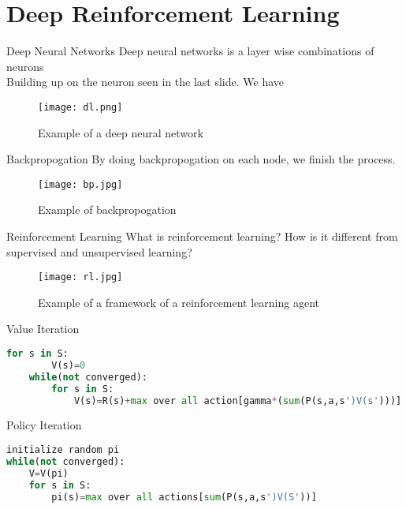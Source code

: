 \section{Deep Reinforcement Learning}
\frame{\sectionpage}

\begin{frame}{Deep Neural Networks}
    Deep neural networks is a layer wise combinations of neurons\\
    Building up on the neuron seen in the last slide. We have
    \begin{figure}
        \centering
        \texttt{[image: dl.png]}\\
        \caption{Example of a deep neural network}
        \label{fig:dl}
    \end{figure}
\end{frame}

\begin{frame}{Backpropogation}
    By doing backpropogation on each node, we finish the process. 
    \begin{figure}
        \centering
        \texttt{[image: bp.jpg]}\\
        \caption{Example of backpropogation }
        \label{fig:bp}
    \end{figure}
\end{frame}

\begin{frame}{Reinforcement Learning}
    What is reinforcement learning? How is it different from supervised and unsupervised learning?
    \begin{figure}
        \centering
        \texttt{[image: rl.jpg]}\\
        \caption{Example of a framework of a reinforcement learning agent }
        \label{fig:rl}
    \end{figure}
\end{frame}

\begin{frame}[fragile]{Value Iteration}
    \begin{lstlisting}[language=python, caption=value iteration algorithm]
    for s in S:
        V(s)=0
    while(not converged):
        for s in S:
            V(s)=R(s)+max over all action[gamma*(sum(P(s,a,s')V(s')))]
    \end{lstlisting}
\end{frame}

\begin{frame}[fragile]{Policy Iteration}
\begin{lstlisting}[language=python, caption=Policy iteration algorithm]
initialize random pi
while(not converged):
    V=V(pi)
    for s in S:
        pi(s)=max over all actions[sum(P(s,a,s')V(S'))]
\end{lstlisting}
\end{frame}

